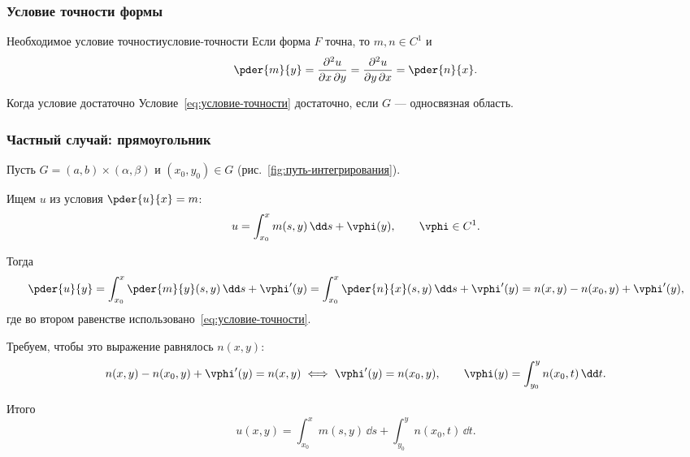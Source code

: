 \subsubsection*{Условие точности формы}

\begin{Statement}{Необходимое условие точности}{условие-точности}
	Если форма $F$ точна, то $m,n \in C^1$ и
	\begin{equation}\label{eq:условие-точности}
		\pder{m}{y}
		= \frac{\partial^2 u}{\partial x\,\partial y}
		= \frac{\partial^2 u}{\partial y\,\partial x}
		= \pder{n}{x}.
	\end{equation}
\end{Statement}

\begin{Remark}{Когда условие достаточно}{}
	Условие~\eqref{eq:условие-точности} достаточно, если $G$ --- односвязная
	область.
\end{Remark}

\subsubsection*{Частный случай: прямоугольник}

Пусть $G = (a,b)\times(\alpha,\beta)$ и $(x_0,y_0) \in G$
(рис.~\ref{fig:путь-интегрирования}).

Ищем $u$ из условия $\pder{u}{x} = m$:
\[
u = \int_{x_0}^{x} m(s,y)\,\dd s + \vphi(y), \qquad \vphi \in C^1.
\]

Тогда
\[
\pder{u}{y}
= \int_{x_0}^{x} \pder{m}{y}(s,y)\,\dd s + \vphi'(y)
= \int_{x_0}^{x} \pder{n}{x}(s,y)\,\dd s + \vphi'(y)
= n(x,y) - n(x_0,y) + \vphi'(y),
\]
где во втором равенстве использовано~\eqref{eq:условие-точности}.

Требуем, чтобы это выражение равнялось $n(x,y)$:
\[
n(x,y) - n(x_0,y) + \vphi'(y) = n(x,y)
\iff \vphi'(y) = n(x_0,y),
\qquad
\vphi(y) = \int_{y_0}^{y} n(x_0,t)\,\dd t.
\]

Итого
\[
u(x,y) = \int_{x_0}^{x} m(s,y)\,\dd s + \int_{y_0}^{y} n(x_0,t)\,\dd t.
\]

